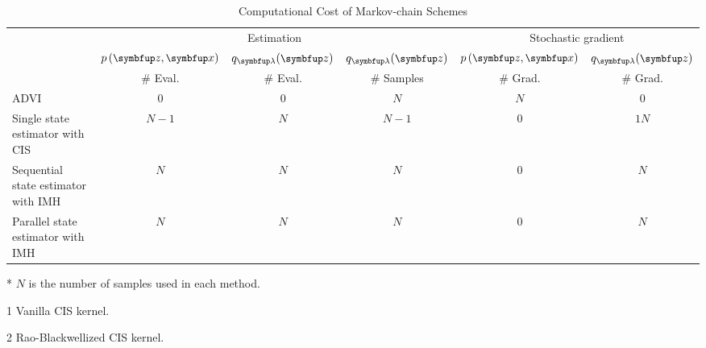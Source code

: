 
\begin{table*}
  \vspace{-0.4in}
\centering
\caption{Computational Cost of Markov-chain Schemes}\label{table:cost}
\setlength{\tabcolsep}{2pt}
  \begin{threeparttable}
\begin{tabular}{lccccc}\toprule
& \multicolumn{3}{c}{\footnotesize Estimation} & \multicolumn{2}{c}{\footnotesize Stochastic gradient} \\
\cmidrule(lr){2-4}\cmidrule(lr){5-6}
  & \(\footnotesize p\left( \vz, \vx \right)\)
  & \(\footnotesize q_{\vlambda}(\vz)\)
  & \(\footnotesize q_{\vlambda}(\vz)\)
  & \(\footnotesize p\left( \vz, \vx \right)\)
  & \(\footnotesize q_{\vlambda}(\vz)\)
  \\
  & {\footnotesize\# Eval.  }
  & {\footnotesize\# Eval.  }
  & {\footnotesize\# Samples}
  & {\footnotesize\# Grad.  }
  & {\footnotesize\# Grad.  }
%
\\\midrule
%
{\footnotesize
ADVI
}
& \(0\)
& \(0\)
& \(N\)
& \(N\)
& \(0\)
\\\arrayrulecolor{black!30}\midrule
%
{\footnotesize
Single state estimator with CIS
}
& \(N-1\)
& \(N\)
& \(N-1\)
& \(0\)
& \(1\)\tnote{1}\;\;{\footnotesize or}\;\(N\)\tnote{2}
\\
%
{\footnotesize
Sequential state estimator with IMH
}
& \(N\)
& \(N\)
& \(N\)
& \(0\)
& \(N\)
\\
%
{\footnotesize
Parallel state estimator with IMH
}
& \(N\)
& \(N\)
& \(N\)
& \(0\)
& \(N\)
\\\bottomrule
\end{tabular}
  \begin{tablenotes}
    \item[*]{\footnotesize \(N\) is the number of samples used in each method}.
    \item[1]{\footnotesize Vanilla CIS kernel}.
    \item[2]{\footnotesize Rao-Blackwellized CIS kernel}.
  \end{tablenotes}
  \end{threeparttable}
  \vspace{-0.1in}
\end{table*}
